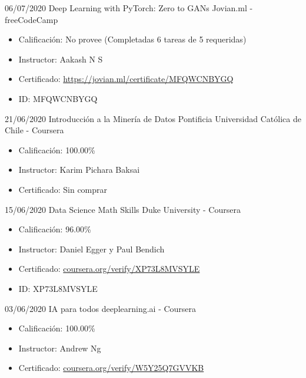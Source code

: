\begin{entrylist}
    \entry
		{06/07/2020}
		{Deep Learning with PyTorch: Zero to GANs}
		{Jovian.ml - freeCodeCamp}
		{
		    \vspace{-5mm}
		    \begin{itemize}
		        \setlength\itemsep{0pt}
		        \item Calificación: No provee (Completadas 6 tareas de 5 requeridas)
		        \item Instructor: Aakash N S
		        \item Certificado: {\href{https://jovian.ml/certificate/MFQWCNBYGQ}{https://jovian.ml/certificate/MFQWCNBYGQ}}
		        \item ID: MFQWCNBYGQ
		    \end{itemize}
		}
    \entry
		{21/06/2020}
		{Introducción a la Minería de Datos}
		{Pontificia Universidad Católica de Chile - Coursera}
		{
		    \vspace{-5mm}
		    \begin{itemize}
		        \setlength\itemsep{0pt}
		        \item Calificación: 100.00\%
		        \item Instructor: Karim Pichara Baksai
		        \item Certificado: Sin comprar
		    \end{itemize}
		}
    \entry
		{15/06/2020}
		{Data Science Math Skills}
		{Duke University - Coursera}
		{
		    \vspace{-5mm}
		    \begin{itemize}
		        \setlength\itemsep{0pt}
		        \item Calificación: 96.00\%
		        \item Instructor: Daniel Egger y Paul Bendich
		        \item Certificado: {\href{https://coursera.org/verify/XP73L8MVSYLE}{coursera.org/verify/XP73L8MVSYLE}}
		        \item ID: XP73L8MVSYLE
		    \end{itemize}
		}
    \entry
		{03/06/2020}
		{IA para todos}
		{deeplearning.ai - Coursera}
		{
		    \vspace{-5mm}
		    \begin{itemize}
		        \setlength\itemsep{0pt}
		        \item Calificación: 100.00\%
		        \item Instructor: Andrew Ng
		        \item Certificado: {\href{https://coursera.org/verify/W5Y25Q7GVVKB}{coursera.org/verify/W5Y25Q7GVVKB}}

\end{itemize}}
\end{entrylist}
